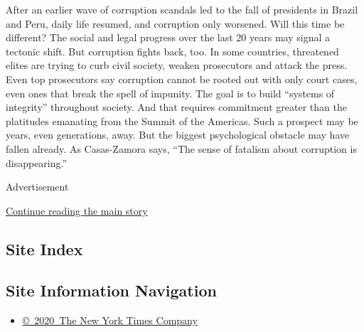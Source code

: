After an earlier wave of corruption scandals led to the fall of
presidents in Brazil and Peru, daily life resumed, and corruption only
worsened. Will this time be different? The social and legal progress
over the last 20 years may signal a tectonic shift. But corruption
fights back, too. In some countries, threatened elites are trying to
curb civil society, weaken prosecutors and attack the press. Even top
prosecutors say corruption cannot be rooted out with only court cases,
even ones that break the spell of impunity. The goal is to build
``systems of integrity'' throughout society. And that requires
commitment greater than the platitudes emanating from the Summit of the
Americas. Such a prospect may be years, even generations, away. But the
biggest psychological obstacle may have fallen already. As Casas-Zamora
says, ``The sense of fatalism about corruption is disappearing.''

Advertisement

\protect\hyperlink{after-bottom}{Continue reading the main story}

\hypertarget{site-index}{%
\subsection{Site Index}\label{site-index}}

\hypertarget{site-information-navigation}{%
\subsection{Site Information
Navigation}\label{site-information-navigation}}

\begin{itemize}
\tightlist
\item
  \href{https://help.nytimes3xbfgragh.onion/hc/en-us/articles/115014792127-Copyright-notice}{©~2020~The
  New York Times Company}
\end{itemize}

